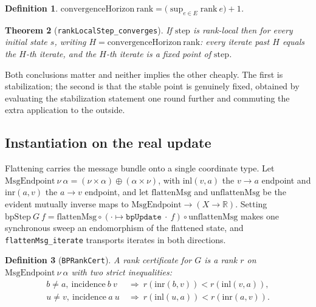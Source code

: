 \documentclass[aps,prx,reprint,nofootinbib,floatfix]{revtex4-2}
\newtheorem{thm}{Theorem}
\newtheorem{defn}[thm]{Definition}
\begin{document}
\begin{defn}
$\mathrm{convergenceHorizon}\ \mathrm{rank} = \bigl(\sup_{e \in E} \mathrm{rank}\ e\bigr) + 1$.
\end{defn}

\begin{thm}[\texttt{rankLocalStep\_converges}]
\label{thm:converges}
If $\mathrm{step}$ is rank-local then for every initial state $s$, writing
$H = \mathrm{convergenceHorizon}\ \mathrm{rank}$: every iterate past $H$ equals
the $H$-th iterate, and the $H$-th iterate is a fixed point of
$\mathrm{step}$.
\end{thm}

Both conclusions matter and neither implies the other cheaply. The first is
stabilization; the second is that the stable point is genuinely fixed, obtained
by evaluating the stabilization statement one round further and commuting the
extra application to the outside.

\subsection{Instantiation on the real update}

Flattening carries the message bundle onto a single coordinate type. Let
$\mathrm{MsgEndpoint}\ \nu\ \alpha = (\nu \times \alpha) \oplus (\alpha \times \nu)$,
with $\mathrm{inl}(v,a)$ the $v \to a$ endpoint and $\mathrm{inr}(a,v)$ the
$a \to v$ endpoint, and let $\mathrm{flattenMsg}$ and $\mathrm{unflattenMsg}$
be the evident mutually inverse maps to $\mathrm{MsgEndpoint} \to (X \to \mathbb{R})$.
Setting $\mathrm{bpStep}\ G\ f = \mathrm{flattenMsg} \circ (\cdot \mapsto
\texttt{bpUpdate}\ \cdot\ f) \circ \mathrm{unflattenMsg}$ makes one synchronous
sweep an endomorphism of the flattened state, and
\texttt{flattenMsg\_iterate} transports iterates in both directions.

\begin{defn}[\texttt{BPRankCert}]
\label{def:cert}
A rank certificate for $G$ is a rank $r$ on $\mathrm{MsgEndpoint}\ \nu\ \alpha$
with two strict inequalities:
\begin{align}
\label{eq:vargt}
b \neq a,\ \mathrm{incidence}\ b\ v &\ \Rightarrow\ r(\mathrm{inr}(b,v)) < r(\mathrm{inl}(v,a)),\\
\label{eq:facgt}
u \neq v,\ \mathrm{incidence}\ a\ u &\ \Rightarrow\ r(\mathrm{inl}(u,a)) < r(\mathrm{inr}(a,v)).
\end{align}
\end{defn}
\end{document}
